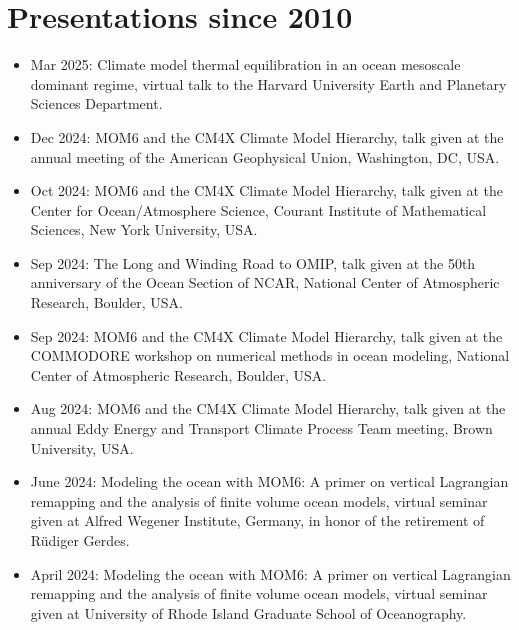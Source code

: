 


\section*{\sc \color{Maroon} Presentations since 2010}
\vspace{-.3cm}

\begin{itemize}[leftmargin=*]

\item Mar 2025: {\sc Climate model thermal equilibration in an ocean mesoscale dominant regime}, virtual talk to the Harvard University Earth and Planetary Sciences Department.

\item Dec 2024: {\sc MOM6 and the CM4X Climate Model Hierarchy}, talk given at the annual meeting of the American Geophysical Union, Washington, DC, USA. 

\item Oct 2024: {\sc MOM6 and the CM4X Climate Model Hierarchy}, talk given at the Center for Ocean/Atmosphere Science, Courant Institute of Mathematical Sciences, New York University, USA. 

\item Sep 2024: {\sc The Long and Winding Road to OMIP}, talk given at the 50th anniversary of the Ocean Section of NCAR, National Center of Atmospheric Research, Boulder, USA. 

\item Sep 2024: {\sc MOM6 and the CM4X Climate Model Hierarchy}, talk given at the COMMODORE workshop on numerical methods in ocean modeling, National Center of Atmospheric Research, Boulder, USA. 

\item Aug 2024: {\sc MOM6 and the CM4X Climate Model Hierarchy}, talk given at the annual Eddy Energy and Transport Climate Process Team meeting, Brown University, USA. 

\item June 2024: {\sc Modeling the ocean with MOM6: A primer on vertical Lagrangian remapping and the analysis of finite volume ocean models}, virtual seminar given at Alfred Wegener Institute, Germany, in honor of the retirement of {R\"{u}diger} Gerdes. 

\item April 2024: {\sc Modeling the ocean with MOM6: A primer on vertical Lagrangian remapping and the analysis of finite volume ocean models}, virtual seminar given at University of Rhode Island Graduate School of Oceanography. 


\end{itemize}
